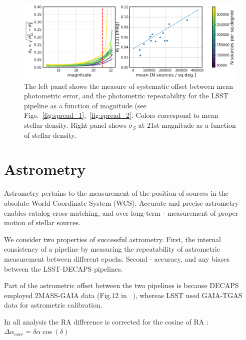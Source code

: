 \documentclass[DM,lsstdraft,toc,usenatbib]{lsstdoc}
\begin{document}
\begin{figure}
\begin{centering}
\includegraphics[width=0.95\columnwidth]{figs/photometric_offset_combined.png}
\caption{The left panel shows the measure of systematic offset between mean photometric error, and the photometric repeatability for the LSST pipeline as a function of magnitude (see Figs.~\ref{fig:spread_1},~\ref{fig:spread_2}. Colors correspond to mean stellar density. Right panel shows $\sigma_{S}$ at 21st magnitude  as a function of stellar density.}
\label{fig:spread_summary}
\end{centering}
\end{figure} 


\section{Astrometry}
\label{sec:astrometry}
Astrometry pertains to the measurement of the position of sources in the absolute World Coordinate System (WCS). Accurate and precise astrometry enables catalog cross-matching, and over long-term - measurement of proper motion of stellar sources. 

We consider two properties of successful astrometry. First, the internal consistency of a pipeline by measuring the repeatability of astrometric measurement between different epochs.  Second - accuracy, and any biases between the LSST-DECAPS pipelines. 

Part of the astrometric offset between the two pipelines is because  DECAPS employed 2MASS-GAIA data (Fig.12 in ~\cite{schlafly2017}), whereas LSST used GAIA-TGAS data for astrometric calibration. 

In all analysis the RA difference is corrected for the cosine of RA : $\Delta \alpha_{corr} = \delta \alpha \cos{(\delta)}$ %
\end{document}
